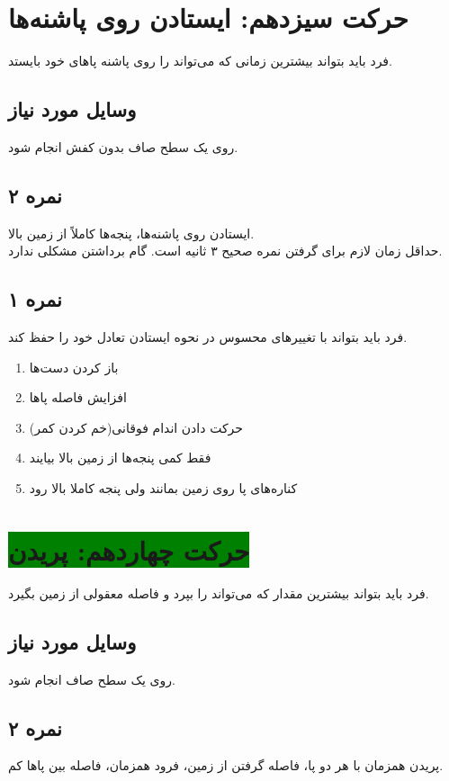 \documentclass[12pt]{report}
\begin{document}
	\section*{حرکت سیزدهم: ایستادن روی پاشنه‌ها}
	فرد باید بتواند بیشترین زمانی که می‌تواند را روی پاشنه پاهای خود بایستد.
	\subsection*{وسایل مورد نیاز}
	روی یک سطح صاف بدون کفش انجام شود.
	\subsection*{نمره ۲}
	ایستادن روی پاشنه‌ها، پنجه‌ها کاملاً از زمین بالا.\\
	حداقل زمان لازم برای گرفتن نمره صحیح ۳ ثانیه است. گام برداشتن مشکلی ندارد.
	\subsection*{نمره ۱}
	فرد باید بتواند با تغییر‌های محسوس در نحوه ایستادن تعادل خود را حفظ کند.
	\begin{enumerate}
		\item باز کردن دست‌ها
		\item افزایش فاصله پاها
		\item حرکت دادن اندام فوقانی(خم کردن کمر)
		\item فقط کمی پنجه‌ها از زمین بالا بیایند
		\item کناره‌های پا روی زمین بمانند ولی پنجه کاملا بالا رود
	\end{enumerate}

	\newpage
	\section*{\colorbox{green}{حرکت چهاردهم: پریدن}}
	فرد باید بتواند بیشترین مقدار که می‌تواند را بپرد و فاصله معقولی از زمین بگیرد.
	\subsection*{وسایل مورد نیاز}
	روی یک سطح صاف انجام شود. 
	\subsection*{نمره ۲}
	پریدن همزمان با هر دو پا، فاصله گرفتن از زمین، فرود همزمان، فاصله بین پاها کم.
\end{document}
